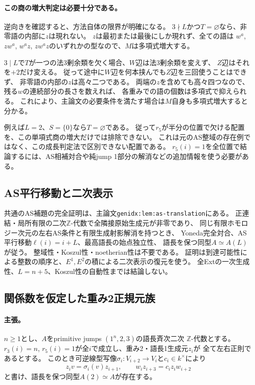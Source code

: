 \documentclass[11pt,a4paper]{ltjsarticle}
\begin{document}
\paragraph{この商の増大判定は必要十分である。}
逆向きを確認すると、方法自体の限界が明確になる。
$3\nmid L$かつ$T=\varnothing$なら、非零語の内部に$z$は現れない。
$z$は最初または最後にしか現れず、全ての語は
$w^a$, $zw^a$, $w^az$, $zw^az$のいずれかの型なので、$M$は多項式増大する。

$3\mid L$で$T$が一つの法3剰余類を欠く場合、$W$辺は法3剰余類を変えず、
$Z$辺はそれを$+2$だけ変える。
従って途中に$W$辺を何本挟んでも$Z$辺を三回使うことはできず、
非零語の内部の$z$は高々二つである。
両端の$z$を含めても高々四つなので、残る$w$の連続部分の長さを数えれば、
各重みでの語の個数は多項式で抑えられる。
これにより、主論文の必要条件を満たす場合は$M$自身も多項式増大すると分かる。

例えば$L=2$、$S=\{0\}$なら$T=\varnothing$である。
従って$r_5$が半分の位置で欠ける配置を、この単項式商の増大だけでは排除できない。
これは元のAS整域の存在例ではなく、この成長判定法で区別できない配置である。
$r_5(i)=1$を全位置で結論するには、AS相補対合や純jump 1部分の解消などの追加情報を使う必要がある。

\subsection{AS平行移動と二次表示}
\label{note:general-as-translation}
共通のAS補題の完全証明は、主論文\texttt{genidx:lem:as-translation}にある。
正連結・局所有限の二次$\mathbb Z$-代数で全隣接原始生成元が非零であり、
同じ有限ホモロジー次元の左右AS条件と有限生成射影解消を持つとき、
Yoneda完全対合、AS平行移動$\ell(i)=i+L$、最高語長の始点独立性、
語長を保つ同型$A\simeq A(L)$が従う。
整域性・Koszul性・noetherian性は不要である。
証明は到達可能性による整数の順序と、$E^1,E^2$の積による二次表示の復元を使う。
全Extの一次生成性、$L=n+5$、Koszul性の自動性までは結論しない。

\subsection{関係数を仮定した重み2正規元族}
\label{note:general-normal-z}
\paragraph{主張。}
$n\geq1$とし、$A$をprimitive jumps $(1^n,2,3)$の語長斉次二次
$\mathbb Z$-代数とする。
$r_3(i)=n$, $r_5(i)=1$が全$i$で成立し、重み2・語長1生成元$z_i$が
全て左右正則であるとする。
このとき可逆線型写像$\sigma_i:V_{i+2}\to V_i$と$c_i\in k^\times$により
\[
z_i v=\sigma_i(v)z_{i+1},\qquad
w_i z_{i+3}=c_i z_i w_{i+2}
\]
と書け、語長を保つ同型$A(2)\simeq A$が存在する。
\end{document}
